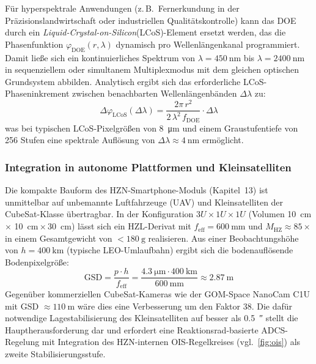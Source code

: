 ﻿\documentclass[12pt,a4paper]{article}
\theoremstyle{definition}
\newcommand{\HZ}{\mathrm{HZ}}
\newcommand{\eff}{\mathrm{eff}}
\newcommand{\DOE}{\mathrm{DOE}}
\begin{document}
	Für hyperspektrale Anwendungen (z.\,B.\ Fernerkundung in der
	Präzisionslandwirtschaft oder industriellen Qualitätskontrolle)
	kann das DOE durch ein \emph{Liquid-Crystal-on-Silicon}(LCoS)-Element
	ersetzt werden, das die Phasenfunktion $\varphi_\DOE(r, \lambda)$
	dynamisch pro Wellenlängenkanal programmiert.  Damit ließe sich
	ein kontinuierliches Spektrum von $\lambda = \SI{450}{\nano\metre}$
	bis $\lambda = \SI{2400}{\nano\metre}$ in sequenziellem oder simultanem
	Multiplexmodus mit dem gleichen optischen Grundsystem abbilden.
	Analytisch ergibt sich das erforderliche LCoS-Phaseninkrement
	zwischen benachbarten Wellenlängenbänden $\Delta\lambda$ zu:
	\begin{equation}
		\Delta\varphi_\mathrm{LCoS}(\Delta\lambda)
		= \frac{2\pi\,r^2}{2\,\lambda^2\,f_\DOE}\cdot\Delta\lambda
		\label{eq:lcos_increment}
	\end{equation}
	was bei typischen LCoS-Pixelgrößen von \SI{8}{\micro\metre} und
	einem Graustufentiefe von 256 Stufen eine spektrale Auflösung von
	$\Delta\lambda \approx \SI{4}{\nano\metre}$ ermöglicht.

	\subsubsection{Integration in autonome Plattformen und Kleinsatelliten}

	Die kompakte Bauform des HZN-Smartphone-Moduls (Kapitel~13) ist
	unmittelbar auf unbemannte Luftfahrzeuge (UAV) und Kleinsatelliten
	der CubeSat-Klasse übertragbar.  In der Konfiguration
	$3U\times1U\times1U$ (Volumen \SI{10}{\centi\metre}\,$\times$
	\SI{10}{\centi\metre}\,$\times$\,\SI{30}{\centi\metre}) lässt sich
	ein HZL-Derivat mit $f_\eff = \SI{600}{\milli\metre}$ und
	$M_\HZ \approx 85\times$ in einem Gesamtgewicht von
	$< \SI{180}{\gram}$ realisieren.  Aus einer
	Beobachtungshöhe von $h = \SI{400}{\kilo\metre}$ (typische
	LEO-Umlaufbahn) ergibt sich die bodenauflösende Bodenpixelgröße:
	\begin{equation}
		\mathrm{GSD} = \frac{p \cdot h}{f_\eff}
		= \frac{\SI{4.3}{\micro\metre}\cdot\SI{400}{\kilo\metre}}
		{\SI{600}{\milli\metre}}
		\approx \SI{2.87}{\metre}
		\label{eq:gsd}
	\end{equation}
	Gegenüber kommerziellen CubeSat-Kameras wie der GOM-Space
	NanoCam C1U mit GSD $\approx \SI{110}{\metre}$ wäre dies eine
	Verbesserung um den Faktor 38.  Die dafür notwendige
	Lagestabilisierung des Kleinsatelliten auf besser als
	\SI{0.5}{\arcsecond} stellt die Hauptherausforderung dar und
	erfordert eine Reaktionsrad-basierte ADCS-Regelung mit Integration
	des HZN-internen OIS-Regelkreises (vgl.\ \cref{fig:ois}) als
	zweite Stabilisierungsstufe.
\end{document}
